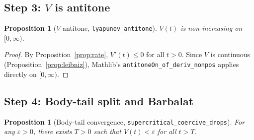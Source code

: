 \documentclass[11pt,a4paper]{article}
\newtheorem{proposition}[theorem]{Proposition}
\theoremstyle{definition}
\begin{document}
\subsection{Step 3: $V$ is antitone}\label{sec:antitone}

\begin{proposition}[$V$ antitone, \texttt{lyapunov\_antitone}]\label{prop:antitone}
$V(t)$ is non-increasing on $[0,\infty)$.
\end{proposition}

\begin{proof}
By Proposition~\ref{prop:rate}, $V'(t) \leq 0$ for all $t > 0$. Since $V$ is continuous (Proposition~\ref{prop:leibniz}), Mathlib's \texttt{antitoneOn\_of\_deriv\_nonpos} applies directly on $[0,\infty)$.
\end{proof}

\subsection{Step 4: Body-tail split and Barbalat}

\begin{proposition}[Body-tail convergence, \texttt{supercritical\_coercive\_drops}]\label{prop:drop}
For any $\varepsilon > 0$, there exists $T > 0$ such that $V(t) < \varepsilon$ for all $t > T$.
\end{proposition}
\end{document}
